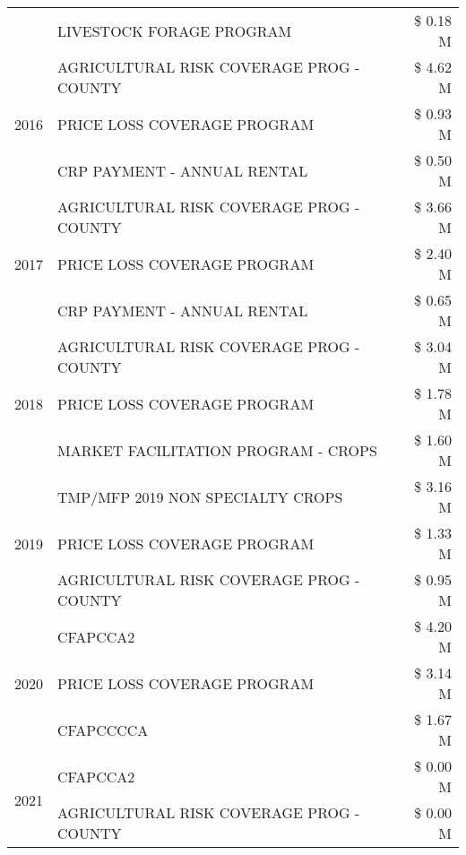 \begin{tabular}{llr}
 & LIVESTOCK FORAGE PROGRAM & \$ 0.18 M \\
\cline{1-3}
\multirow[t]{3}{*}{2016} & AGRICULTURAL RISK COVERAGE PROG - COUNTY & \$ 4.62 M \\
 & PRICE LOSS COVERAGE PROGRAM & \$ 0.93 M \\
 & CRP PAYMENT - ANNUAL RENTAL & \$ 0.50 M \\
\cline{1-3}
\multirow[t]{3}{*}{2017} & AGRICULTURAL RISK COVERAGE PROG - COUNTY & \$ 3.66 M \\
 & PRICE LOSS COVERAGE PROGRAM & \$ 2.40 M \\
 & CRP PAYMENT - ANNUAL RENTAL & \$ 0.65 M \\
\cline{1-3}
\multirow[t]{3}{*}{2018} & AGRICULTURAL RISK COVERAGE PROG - COUNTY & \$ 3.04 M \\
 & PRICE LOSS COVERAGE PROGRAM & \$ 1.78 M \\
 & MARKET FACILITATION PROGRAM - CROPS & \$ 1.60 M \\
\cline{1-3}
\multirow[t]{3}{*}{2019} & TMP/MFP 2019 NON SPECIALTY CROPS & \$ 3.16 M \\
 & PRICE LOSS COVERAGE PROGRAM & \$ 1.33 M \\
 & AGRICULTURAL RISK COVERAGE PROG - COUNTY & \$ 0.95 M \\
\cline{1-3}
\multirow[t]{3}{*}{2020} & CFAPCCA2 & \$ 4.20 M \\
 & PRICE LOSS COVERAGE PROGRAM & \$ 3.14 M \\
 & CFAPCCCCA & \$ 1.67 M \\
\cline{1-3}
\multirow[t]{2}{*}{2021} & CFAPCCA2 & \$ 0.00 M \\
 & AGRICULTURAL RISK COVERAGE PROG - COUNTY & \$ 0.00 M \\
\cline{1-3}
\bottomrule
\end{tabular}
